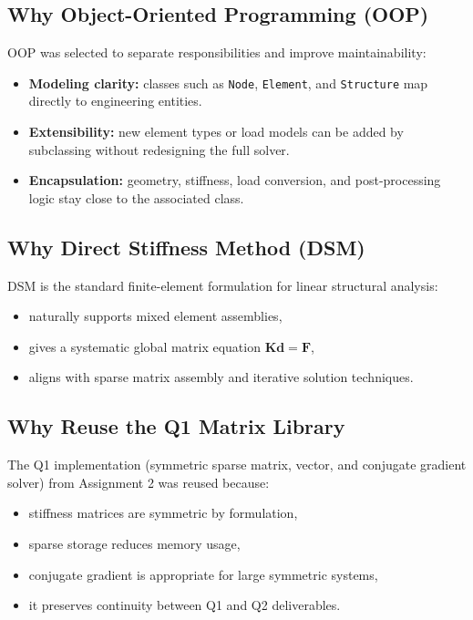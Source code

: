 \subsection*{Why Object-Oriented Programming (OOP)}
OOP was selected to separate responsibilities and improve maintainability:
\begin{itemize}
    \item \textbf{Modeling clarity:} classes such as \texttt{Node}, \texttt{Element}, and \texttt{Structure} map directly to engineering entities.
    \item \textbf{Extensibility:} new element types or load models can be added by subclassing without redesigning the full solver.
    \item \textbf{Encapsulation:} geometry, stiffness, load conversion, and post-processing logic stay close to the associated class.
\end{itemize}

\subsection*{Why Direct Stiffness Method (DSM)}
DSM is the standard finite-element formulation for linear structural analysis:
\begin{itemize}
    \item naturally supports mixed element assemblies,
    \item gives a systematic global matrix equation \(\mathbf{K}\mathbf{d}=\mathbf{F}\),
    \item aligns with sparse matrix assembly and iterative solution techniques.
\end{itemize}

\subsection*{Why Reuse the Q1 Matrix Library}
The Q1 implementation (symmetric sparse matrix, vector, and conjugate gradient solver) from Assignment 2 was reused because:
\begin{itemize}
    \item stiffness matrices are symmetric by formulation,
    \item sparse storage reduces memory usage,
    \item conjugate gradient is appropriate for large symmetric systems,
    \item it preserves continuity between Q1 and Q2 deliverables.
\end{itemize}

